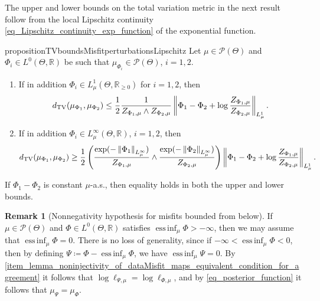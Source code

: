 \documentclass[a4paper]{scrartcl}
\theoremstyle{definition}
\newtheorem{remark}[theorem]{Remark}
\numberwithin{equation}{section}
\newcommand{\R}{\mathbb{R}}
\DeclareMathOperator*{\essinf}{ess\,inf}
\newcommand{\Norm}[1]{\left\Vert #1 \right\Vert}
\newcommand{\TV}[0]{\textup{TV}}
\begin{document}
The upper and lower bounds on the total variation metric in the next result follow from the local Lipschitz continuity \eqref{eq_Lipschitz_continuity_exp_function} of the exponential function.
\begin{restatable}{proposition}{TVboundsMisfitperturbationsLipschitz}
 \label{proposition_TV_bounds_misfit_perturbations_via_Lipschitz_continuity}
 Let $\mu\in\mathcal{P}(\Theta)$ and $\Phi_i\in L^0(\Theta,\R)$ be such that $\mu_{\Phi_i}\in \mathcal{P}(\Theta)$, $i=1,2$.
\begin{enumerate}
 \item  \label{proposition_TV_bounds_misfit_perturbations_via_Lipschitz_continuity_upper_bound}  If in addition $\Phi_i\in L^1_\mu(\Theta,\R_{\geq 0})$ for $i=1,2$, then
   \begin{equation*}
    d_{\TV}(\mu_{\Phi_1},\mu_{\Phi_2}) \leq \frac{1}{2}\frac{1}{Z_{\Phi_1,\mu}\wedge Z_{\Phi_2,\mu}}\Norm{\Phi_1-\Phi_2+\log \frac{Z_{\Phi_1,\mu}}{Z_{\Phi_2,\mu}}}_{L^1_\mu}.
  \end{equation*}
\item \label{proposition_TV_bounds_misfit_perturbations_via_Lipschitz_continuity_lower_bound}
If in addition $\Phi_i\in L^\infty_\mu(\Theta,\R)$, $i=1,2$, then
  \begin{equation*}
    d_{\TV}(\mu_{\Phi_1},\mu_{\Phi_2}) \geq \frac{1}{2}\left(\frac{\exp(-\Norm{\Phi_1}_{L^\infty_\mu})}{Z_{\Phi_1,\mu}}\wedge\frac{ \exp(-\Norm{\Phi_2}_{L^\infty_\mu})}{ Z_{\Phi_2,\mu}}\right)\Norm{\Phi_1-\Phi_2+\log \frac{Z_{\Phi_1,\mu}}{Z_{\Phi_2,\mu}}}_{L^1_\mu}.
  \end{equation*}
\end{enumerate}
If $\Phi_1-\Phi_2$ is constant $\mu$-a.s., then equality holds in both the upper and lower bounds.
\end{restatable}
 
\begin{remark}[Nonnegativity hypothesis for misfits bounded from below]
\label{remark_nonnegativity_hypothesis}
 If $\mu\in\mathcal{P}(\Theta)$ and $\Phi\in L^0(\Theta,\R)$ satisfies $\essinf_\mu\Phi>-\infty$, then we may assume that $\essinf_\mu \Phi=0$. 
There is no loss of generality, since if $-\infty<\essinf_\mu \Phi<0$, then by defining $\Psi\coloneqq \Phi-\essinf_\mu\Phi$, we have $\essinf_\mu \Psi=0$.
By \ref{item_lemma_noninjectivity_of_dataMisfit_maps_equivalent_condition_for_agreement} it follows that $\log \ell_{\Psi,\mu}=\log \ell_{\Phi,\mu}$, and by \eqref{eq_posterior_function} it follows that $\mu_{\Psi}=\mu_{\Phi}$. 
\end{remark}
\end{document}
